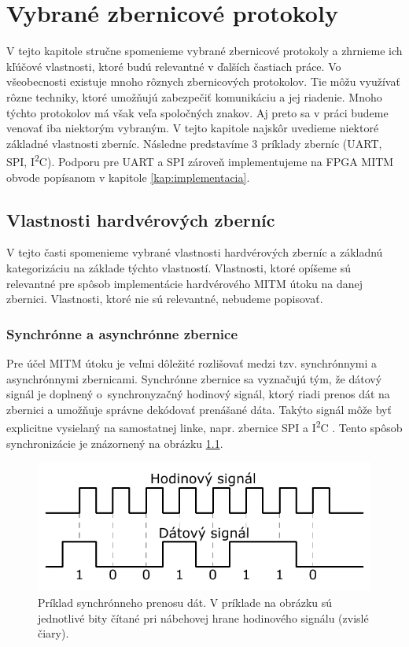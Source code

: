 \chapter{Vybrané zbernicové protokoly}
\label{kap:zbernice}

V tejto kapitole stručne spomenieme vybrané zbernicové protokoly a zhrnieme ich kľúčové vlastnosti, ktoré budú relevantné v ďalších častiach práce. Vo všeobecnosti existuje mnoho rôznych zbernicových protokolov. Tie môžu využívať rôzne techniky, ktoré umožňujú zabezpečiť komunikáciu a jej riadenie. Mnoho týchto protokolov má však veľa spoločných znakov. Aj preto sa v práci budeme venovať iba niektorým vybraným. V tejto kapitole najskôr uvedieme niektoré základné vlastnosti zberníc. Následne predstavíme 3 príklady zberníc (UART, SPI, I\textsuperscript{2}C). Podporu pre UART a SPI zároveň implementujeme na FPGA MITM obvode popísanom v kapitole \ref{kap:implementacia}.

\section{Vlastnosti hardvérových zberníc}
V tejto časti spomenieme vybrané vlastnosti hardvérových zberníc a základnú kategorizáciu na základe týchto vlastností. Vlastnosti, ktoré opíšeme sú relevantné pre spôsob implementácie hardvérového MITM útoku na danej zbernici. Vlastnosti, ktoré nie sú relevantné, nebudeme popisovať.

\subsection{Synchrónne a asynchrónne zbernice} \label{sek:syncAsync}
Pre účel MITM útoku je veľmi dôležité rozlišovať medzi tzv. synchrónnymi a asynchrónnymi zbernicami. Synchrónne zbernice sa vyznačujú tým, že dátový signál je doplnený o~synchronyzačný hodinový signál, ktorý riadi prenos dát na zbernici a umožňuje správne dekódovať prenášané dáta. Takýto signál môže byť explicitne vysielaný na samostatnej linke, napr. zbernice SPI \cite{spiBus} a I\textsuperscript{2}C \cite{i2cSpec}. Tento spôsob synchronizácie je znázornený na obrázku \ref{obr:clockDemo}.

\begin{figure}
    \centerline{\includegraphics[width=1\textwidth]{images/signals/clockDemo.pdf}}
    \caption[Príklad synchrónneho prenosu dát]{Príklad synchrónneho prenosu dát. V príklade na obrázku sú jednotlivé bity čítané pri nábehovej hrane hodinového signálu (zvislé čiary).}
    \label{obr:clockDemo}
\end{figure}

